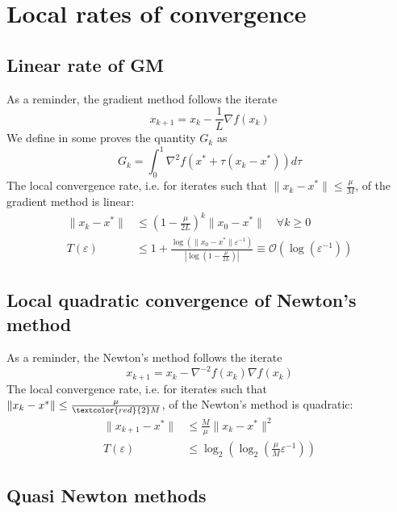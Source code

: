 \documentclass[12pt, openany]{report}
\theoremstyle{definition}
\begin{document}
\section{Local rates of convergence}
\subsection{Linear rate of GM}
As a reminder, the gradient method follows the iterate 
\begin{equation}
	x_{k+1} = x_k - \frac{1}{L}\nabla f(x_k)
\end{equation}
We define in some proves the quantity $G_k$ as 
\begin{equation}
	G_k = \int_0^1 \nabla^2 f(x^*+\tau(x_k-x^*))d\tau
\end{equation}
The local convergence rate, i.e. for iterates such that $\|x_k -x^*\| \leq \frac{\mu}{M}$, of the gradient method is linear:
\begin{equation}
	\begin{aligned}
		\|x_k - x^*\| &\leq \left(1-\frac{\mu}{2L}\right)^k \|x_0-x^*\| \quad \forall k \geq 0\\
		T(\varepsilon)&\leq 1+ \frac{\log \left(\|x_0 - x^*\|\varepsilon^{-1}\right)}{|\log \left(1-\frac{\mu}{2L}\right)|} \equiv \mathcal{O}(\log(\varepsilon^{-1}))
	\end{aligned}
\end{equation}
\subsection{Local quadratic convergence of Newton's method}
As a reminder, the Newton's method follows the iterate
\begin{equation}
	x_{k+1} = x_k - \nabla^{-2}f(x_k)\nabla f(x_k)	
\end{equation}
The local convergence rate, i.e. for iterates such that $\|x_k -x^*\| \leq \frac{\mu}{\textcolor{red}{2}M}$, of the Newton's method is quadratic:
\begin{equation}
	\begin{aligned}
		\|x_{k+1}-x^*\| &\leq \frac{M}{\mu}\|x_k-x^*\|^2\\
		T(\varepsilon) &\leq \log_2(\log_2(\frac{\mu}{M} \varepsilon^{-1}))
	\end{aligned}
\end{equation}
\subsection{Quasi Newton methods}
\end{document}
